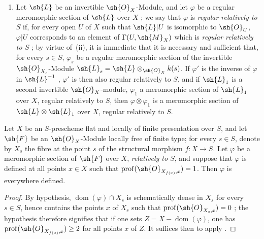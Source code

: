 \begin{remarks}[20.6.5]
\begin{enumerate}[label=(\roman*)]
  \item Let $\sh{L}$ be an invertible $\sh{O}_X$-Module, and let $\varphi$ be a regular meromorphic section of $\sh{L}$ over $X$ ;
  we say that $\varphi$ is \emph{regular relatively to $S$} if, for every open $U$ of $X$ such that $\sh{L}|U$ is isomorphic to $\sh{O}_U$, $\varphi|U$ corresponds to an element of $\Gamma(U,\sh{M}_X)$ which is \emph{regular relatively to $S$} ;
  by virtue of~(ii), it is immediate that it is necessary and sufficient that, for every $s\in S$, $\varphi_s$ be a regular meromorphic section  of the invertible $\sh{O}_{X_s}$-Module $\sh{L}_s=\sh{L}\otimes_{\sh{O}_X}k(s)$.
  If $\varphi'$ is the inverse of $\varphi$ in $\sh{L}^{-1}$ , $\varphi'$ is then also regular relatively to $S$, and if $\sh{L}_1$ is a second invertible $\sh{O}_X$-module, $\varphi_1$ a meromorphic section of $\sh{L}_1$ over $X$, regular relatively to $S$, then $\varphi\otimes\varphi_1$ is a meromorphic section of $\sh{L}\otimes\sh{L}_1$ over $X$, regular relatively to $S$.
\end{enumerate}
\end{remarks}

\begin{proposition}[20.6.6]
\label{IV.20.6.6}
Let $X$ be an $S$-prescheme flat and locally of finite presentation over $S$, and let $\sh{F}$ be an $\sh{O}_X$-Module locally free of finite type;
for every $s\in S$, denote by $X_s$ the fibre at the point $s$ of the structural morphism $f:X\to S$.
Let $\varphi$ be a meromorphic section of $\sh{F}$ over $X$, \emph{relatively to $S$}, and suppose that $\varphi$ is defined at all points $x\in X$ such that $\operatorname{prof}(\sh{O}_{X_{f(x)},x})=1$.
Then $\varphi$ is everywhere defined.
\end{proposition}

\begin{proof}
By hypothesis, $\operatorname{dom}(\varphi)\cap X_s$ is schematically dense in $X_s$ for every $s\in S$, hence contains the points $x$ of $X_s$ such that $\operatorname{prof}(\sh{O}_{X_s,x})=0$ ;
the hypothesis therefore signifies that if one sets $Z=X-\operatorname{dom}(\varphi)$, one has $\operatorname{prof}(\sh{O}_{X_{f(x)},x})\geq 2$ for all points $x$ of $Z$.
It suffices then to apply .
\end{proof}

